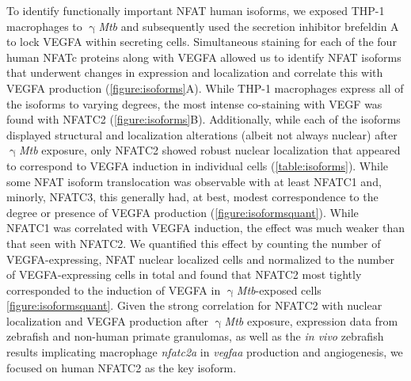 To identify functionally important NFAT human isoforms, we exposed THP\hyp{}1 macrophages to $\upgamma$\textit{Mtb} and subsequently used the secretion inhibitor brefeldin A to lock VEGFA within secreting cells. Simultaneous staining for each of the four human NFATc proteins along with VEGFA allowed us to identify NFAT isoforms that underwent changes in expression and localization and correlate this with VEGFA production (\autoref{figure:isoforms}A). While THP\hyp{}1 macrophages express all of the isoforms to varying degrees, the most intense co\hyp{}staining with VEGF was found with NFATC2 (\autoref{figure:isoforms}B). Additionally, while each of the isoforms displayed structural and localization alterations (albeit not always nuclear) after $\upgamma$\textit{Mtb} exposure, only NFATC2 showed robust nuclear localization that appeared to correspond to VEGFA induction in individual cells (\autoref{table:isoforms}). While some NFAT isoform translocation was observable with at least NFATC1 and, minorly, NFATC3, this generally had, at best, modest correspondence to the degree or presence of VEGFA production (\autoref{figure:isoformsquant}). While NFATC1 was correlated with VEGFA induction, the effect was much weaker than that seen with NFATC2. We quantified this effect by counting the number of VEGFA\hyp{}expressing, NFAT nuclear localized cells and normalized to the number of VEGFA\hyp{}expressing cells in total and found that NFATC2 most tightly corresponded to the induction of VEGFA in $\upgamma$\textit{Mtb}\hyp{}exposed cells \autoref{figure:isoformsquant}. Given the strong correlation for NFATC2 with nuclear localization and VEGFA production after $\upgamma$\textit{Mtb} exposure, expression data from zebrafish and non\hyp{}human primate granulomas, as well as the \textit{in vivo} zebrafish results implicating macrophage \textit{nfatc2a} in \textit{vegfaa} production and angiogenesis, we focused on human NFATC2 as the key isoform.

\singlespacing

